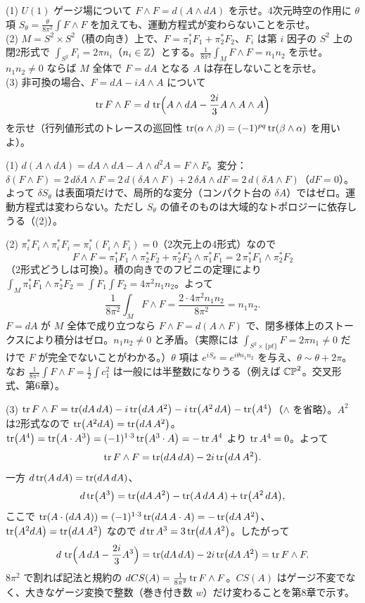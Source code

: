 \begin{problem}[難易度 C]\label{ch05-prob-ff}
(1) $U(1)$ ゲージ場について $F\wedge F=d(A\wedge dA)$ を示せ。4次元時空の作用に $\theta$ 項 $S_\theta=\frac{\theta}{8\pi^2}\int F\wedge F$ を加えても、運動方程式が変わらないことを示せ。\\
(2) $M=S^2\times S^2$（積の向き）上で、$F=\pi_1^*F_1+\pi_2^*F_2$、$F_i$ は第 $i$ 因子の $S^2$ 上の閉2形式で $\int_{S^2}F_i=2\pi n_i$（$n_i\in\mathbb{Z}$）とする。$\frac{1}{8\pi^2}\int_MF\wedge F=n_1n_2$ を示せ。$n_1n_2\neq0$ ならば $M$ 全体で $F=dA$ となる $A$ は存在しないことを示せ。\\
(3) 非可換の場合、$F=dA-iA\wedge A$ について
\[
\tr F\wedge F=d\,\tr\Bigl(A\wedge dA-\frac{2i}{3}A\wedge A\wedge A\Bigr)
\]
を示せ（行列値形式のトレースの巡回性 $\tr(\alpha\wedge\beta)=(-1)^{pq}\tr(\beta\wedge\alpha)$ を用いよ）。
\end{problem}

\begin{solution}
(1) $d(A\wedge dA)=dA\wedge dA-A\wedge d^2A=F\wedge F$。変分：$\delta(F\wedge F)=2\,d\delta A\wedge F=2\,d(\delta A\wedge F)+2\,\delta A\wedge dF=2\,d(\delta A\wedge F)$（$dF=0$）。よって $\delta S_\theta$ は表面項だけで、局所的な変分（コンパクト台の $\delta A$）ではゼロ。運動方程式は変わらない。ただし $S_\theta$ の値そのものは大域的なトポロジーに依存しうる（(2)）。

(2) $\pi_i^*F_i\wedge\pi_i^*F_i=\pi_i^*(F_i\wedge F_i)=0$（2次元上の4形式）なので
\[
F\wedge F=\pi_1^*F_1\wedge\pi_2^*F_2+\pi_2^*F_2\wedge\pi_1^*F_1=2\,\pi_1^*F_1\wedge\pi_2^*F_2
\]
（2形式どうしは可換）。積の向きでのフビニの定理により $\int_M\pi_1^*F_1\wedge\pi_2^*F_2=\int F_1\int F_2=4\pi^2n_1n_2$。よって
\[
\frac1{8\pi^2}\int_MF\wedge F=\frac{2\cdot4\pi^2n_1n_2}{8\pi^2}=n_1n_2 .
\]
$F=dA$ が $M$ 全体で成り立つなら $F\wedge F=d(A\wedge F)$ で、閉多様体上のストークスにより積分はゼロ。$n_1n_2\neq0$ と矛盾。（実際には $\int_{S^2\times\{pt\}}F=2\pi n_1\neq0$ だけで $F$ が完全でないことがわかる。）$\theta$ 項は $e^{iS_\theta}=e^{i\theta n_1n_2}$ を与え、$\theta\sim\theta+2\pi$。なお $\frac1{8\pi^2}\int F\wedge F=\frac12\int c_1^2$ は一般には半整数になりうる（例えば $\mathbb{CP}^2$。交叉形式、第6章）。

(3) $\tr F\wedge F=\tr(dA\,dA)-i\tr(dA\,A^2)-i\tr(A^2\,dA)-\tr(A^4)$（$\wedge$ を省略）。$A^2$ は2形式なので $\tr(A^2dA)=\tr(dA\,A^2)$。$\tr(A^4)=\tr(A\cdot A^3)=(-1)^{1\cdot3}\tr(A^3\cdot A)=-\tr A^4$ より $\tr A^4=0$。よって
\[
\tr F\wedge F=\tr(dA\,dA)-2i\tr(dA\,A^2).
\]
一方 $d\tr(A\,dA)=\tr(dA\,dA)$、
\[
d\tr(A^3)=\tr(dA\,A^2)-\tr(A\,dA\,A)+\tr(A^2\,dA),
\]
ここで $\tr(A\cdot(dA\,A))=(-1)^{1\cdot3}\tr(dA\,A\cdot A)=-\tr(dA\,A^2)$、$\tr(A^2dA)=\tr(dA\,A^2)$ なので $d\tr A^3=3\tr(dA\,A^2)$。したがって
\[
d\,\tr\Bigl(A\,dA-\frac{2i}3A^3\Bigr)=\tr(dA\,dA)-2i\tr(dA\,A^2)=\tr F\wedge F .
\]
$8\pi^2$ で割れば記法と規約の $dCS(A)=\frac1{8\pi^2}\tr F\wedge F$。$CS(A)$ はゲージ不変でなく、大きなゲージ変換で整数（巻き付き数 $w$）だけ変わることを第8章で示す。
\end{solution}

